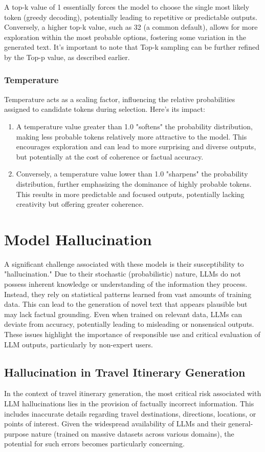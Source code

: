 \documentclass[12pt,a4paper]{report}
\begin{document}
A top-k value of 1 essentially forces the model to choose the single most likely token (greedy decoding), potentially leading to repetitive or predictable outputs. Conversely, a higher top-k value, such as 32 (a common default), allows for more exploration within the most probable options, fostering some variation in the generated text. It's important to note that Top-k sampling can be further refined by the Top-p value, as described earlier.


\subsubsection{Temperature}
Temperature acts as a scaling factor, influencing the relative probabilities assigned to candidate tokens during selection. Here's its impact:
\begin{enumerate}

\item{A temperature value greater than 1.0 "softens" the probability distribution, making less probable tokens relatively more attractive to the model. This encourages exploration and can lead to more surprising and diverse outputs, but potentially at the cost of coherence or factual accuracy.}
\item{Conversely, a temperature value lower than 1.0 "sharpens" the probability distribution, further emphasizing the dominance of highly probable tokens. This results in more predictable and focused outputs, potentially lacking creativity but offering greater coherence.}
\end{enumerate}

\section{Model Hallucination}
A significant challenge associated with these models is their susceptibility to "hallucination." Due to their stochastic (probabilistic) nature, LLMs do not possess inherent knowledge or understanding of the information they process. Instead, they rely on statistical patterns learned from vast amounts of training data. This can lead to the generation of novel text that appears plausible but may lack factual grounding. Even when trained on relevant data, LLMs can deviate from accuracy, potentially leading to misleading or nonsensical outputs. These issues highlight the importance of responsible use and critical evaluation of LLM outputs, particularly by non-expert users.

\subsection{Hallucination in Travel Itinerary Generation}
In the context of travel itinerary generation, the most critical risk associated with LLM hallucinations lies in the provision of factually incorrect information. This includes inaccurate details regarding travel destinations, directions, locations, or points of interest. Given the widespread availability of LLMs and their general-purpose nature (trained on massive datasets across various domains), the potential for such errors becomes particularly concerning.
\end{document}
